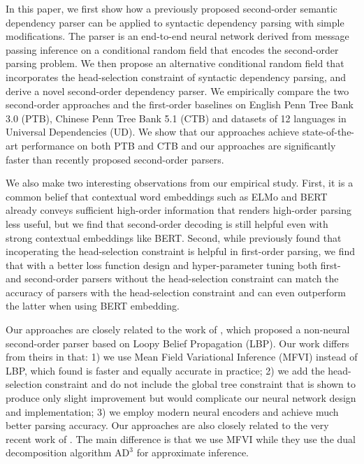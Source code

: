 \documentclass[11pt,a4paper]{article}
\begin{document}
In this paper, we first show how a previously proposed second-order semantic dependency parser \cite{wang-etal-2019-second} can be applied to syntactic dependency parsing with simple modifications. The parser is an end-to-end neural network derived from message passing inference on a conditional random field that encodes the second-order parsing problem. We then propose an alternative conditional random field that incorporates the head-selection constraint of syntactic dependency parsing, and derive a novel second-order dependency parser. We empirically compare the two second-order approaches and the first-order baselines on English Penn Tree Bank 3.0 (PTB), Chinese Penn Tree Bank 5.1 (CTB) and datasets of 12 languages in Universal Dependencies (UD). We show that our approaches achieve state-of-the-art performance on both PTB and CTB and our approaches are significantly faster than recently proposed second-order parsers. 

We also make two interesting observations from our empirical study. First, it is a common belief that contextual word embeddings such as ELMo \cite{peters-etal-2018-deep} and BERT \cite{devlin-etal-2019-bert} already conveys sufficient high-order information that renders high-order parsing less useful, but we find that second-order decoding is still helpful even with strong contextual embeddings like BERT. Second, while \citet{zhang-etal-2019-empirical} previously found that incoperating the head-selection constraint is helpful in first-order parsing, we find that with a better loss function design and hyper-parameter tuning both first- and second-order parsers without the head-selection constraint can match the accuracy of parsers with the head-selection constraint and can even outperform the latter when using BERT embedding.

Our approaches are closely related to the work of \citet{gormley-etal-2015-approximation}, which proposed a non-neural second-order parser based on Loopy Belief Propagation (LBP). Our work differs from theirs in that: 1) we use Mean Field Variational Inference (MFVI) instead of LBP, which \citet{wang-etal-2019-second} found is faster and equally accurate in practice; 2) we add the head-selection constraint and do not include the global tree constraint that is shown to produce only slight improvement \cite{zhang-etal-2019-empirical} but would complicate our neural network design and implementation; 3) we employ modern neural encoders and achieve much better parsing accuracy. Our approaches are also closely related to the very recent work of \citet{turbo2020}. The main difference is that we use MFVI while they use the dual decomposition algorithm $\text{AD}^\text{3}$ \citep{martins-etal-2011-dual,martins-etal-2013-turning} for approximate inference.
\end{document}
